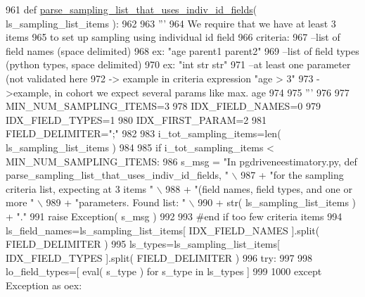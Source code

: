 \begin{DoxyCode}
961 \textcolor{keyword}{def }\hyperlink{namespacenegui_1_1pgdriveneestimator_a367b16a89c7ae46ab0bda5b37e68d9af}{parse\_sampling\_list\_that\_uses\_indiv\_id\_fields}( 
      ls\_sampling\_list\_items ):
962 
963     \textcolor{stringliteral}{'''}
964 \textcolor{stringliteral}{    We require that we have at least 3 items}
965 \textcolor{stringliteral}{    to set up  sampling using individual id field}
966 \textcolor{stringliteral}{    criteria:}
967 \textcolor{stringliteral}{    --list of field names (space delimited)}
968 \textcolor{stringliteral}{        ex: "age parent1 parent2"}
969 \textcolor{stringliteral}{    --list of field types (python types, space delimited)}
970 \textcolor{stringliteral}{        ex: "int str str"}
971 \textcolor{stringliteral}{    --at least one parameter (not validated here}
972 \textcolor{stringliteral}{        -> example in criteria expression  "age > 3"}
973 \textcolor{stringliteral}{        ->example, in cohort we expect several params like max. age     }
974 \textcolor{stringliteral}{}
975 \textcolor{stringliteral}{    '''}
976 
977     MIN\_NUM\_SAMPLING\_ITEMS=3
978     IDX\_FIELD\_NAMES=0
979     IDX\_FIELD\_TYPES=1
980     IDX\_FIRST\_PARAM=2
981     FIELD\_DELIMITER=\textcolor{stringliteral}{";"}
982 
983     i\_tot\_sampling\_items=len( ls\_sampling\_list\_items )
984 
985     \textcolor{keywordflow}{if} i\_tot\_sampling\_items < MIN\_NUM\_SAMPLING\_ITEMS:
986         s\_msg = \textcolor{stringliteral}{"In pgdriveneestimatory.py, def parse\_sampling\_list\_that\_uses\_indiv\_id\_fields, "} \(\backslash\)
987                     + \textcolor{stringliteral}{"for the sampling criteria list, expecting at 3 items "} \(\backslash\)
988                     + \textcolor{stringliteral}{"(field names, field types, and one or more "} \(\backslash\)
989                     + \textcolor{stringliteral}{"parameters.  Found list: "} \(\backslash\)
990                     + str( ls\_sampling\_list\_items ) + \textcolor{stringliteral}{"."}
991         \textcolor{keywordflow}{raise} Exception( s\_msg )
992 
993     \textcolor{comment}{#end if too few criteria items}
994     ls\_field\_names=ls\_sampling\_list\_items[ IDX\_FIELD\_NAMES ].split( FIELD\_DELIMITER )
995     ls\_types=ls\_sampling\_list\_items[ IDX\_FIELD\_TYPES ].split( FIELD\_DELIMITER )
996     \textcolor{keywordflow}{try}:
997 
998         lo\_field\_types=[ eval( s\_type ) \textcolor{keywordflow}{for} s\_type \textcolor{keywordflow}{in} ls\_types ]
999     
1000     \textcolor{keywordflow}{except} Exception \textcolor{keyword}{as} oex:

\end{DoxyCode}
